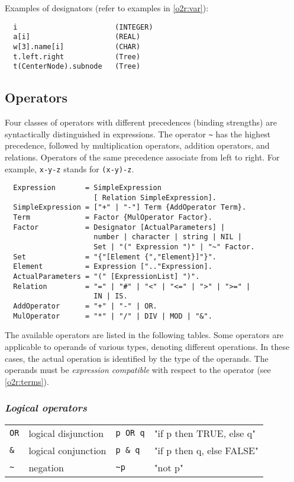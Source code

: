 \noindent
Examples of designators (refer to examples in \ref{o2r:var}):
\begin{verbatim}
  i                       (INTEGER)
  a[i]                    (REAL)
  w[3].name[i]            (CHAR)
  t.left.right            (Tree)
  t(CenterNode).subnode   (Tree)
\end{verbatim}

\subsection{Operators}\label{o2r:operators}

Four classes of operators with different precedences (binding strengths)
are syntactically distinguished in expressions. The operator \verb|~| has
the highest precedence, followed by multiplication operators, addition
operators, and relations. Operators of the same precedence associate
from left to right. For example, \verb|x-y-z| stands for \verb|(x-y)-z|.
{\BNFsize
\begin{verbatim}
  Expression       = SimpleExpression
                     [ Relation SimpleExpression].
  SimpleExpression = ["+" | "-"] Term {AddOperator Term}.
  Term             = Factor {MulOperator Factor}.
  Factor           = Designator [ActualParameters] |
                     number | character | string | NIL |
                     Set | "(" Expression ")" | "~" Factor.
  Set              = "{"[Element {","Element}]"}".
  Element          = Expression [".."Expression].
  ActualParameters = "(" [ExpressionList] ")".
  Relation         = "=" | "#" | "<" | "<=" | ">" | ">=" |
                     IN | IS.
  AddOperator      = "+" | "-" | OR.
  MulOperator      = "*" | "/" | DIV | MOD | "&".
\end{verbatim}}

\noindent
The available operators are listed in the following tables. Some operators
are applicable to operands of various types, denoting different operations.
In these cases, the actual operation is identified by the type of
the operands. The operands must be {\em expression compatible} with
respect to the operator (see \ref{o2r:terms}).

\subsubsection{\em Logical operators}

\begin{tabular}{llll}
\verb|OR|  & logical disjunction & \verb|p OR q| & "if p then TRUE, else q" \\
\verb|&|   & logical conjunction & \verb|p & q|  &  "if p then q, else FALSE" \\
\verb|~|   & negation            & \verb|~p|     &         "not p"  \\
\end{tabular}

